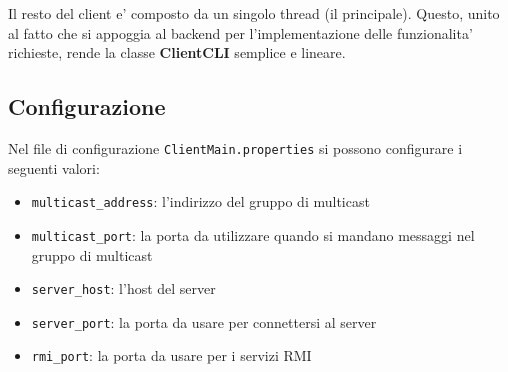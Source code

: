 Il resto del client e' composto da un singolo thread (il principale). Questo, unito al fatto che si appoggia al backend per l'implementazione delle funzionalita' richieste, rende la classe \textbf{ClientCLI} semplice e lineare.

\subsection{Configurazione}

Nel file di configurazione \texttt{ClientMain.properties} si possono configurare i seguenti valori:
\begin{itemize}
	\item \texttt{multicast\_address}: l'indirizzo del gruppo di multicast
	\item \texttt{multicast\_port}: la porta da utilizzare quando si mandano messaggi nel gruppo di multicast
	\item \texttt{server\_host}: l'host del server
	\item \texttt{server\_port}: la porta da usare per connettersi al server
	\item \texttt{rmi\_port}: la porta da usare per i servizi RMI
\end{itemize}